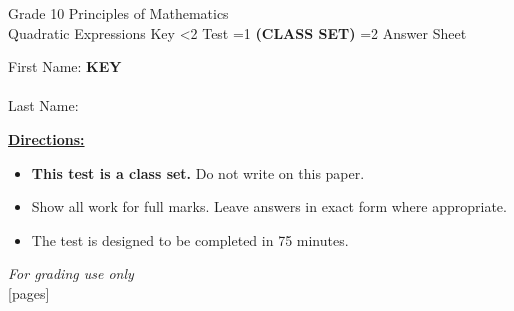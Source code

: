 \documentclass[addpoints]{exam}
\newcommand{\event}{Quadratic Expressions}
\newcommand{\tournament}{}
\def\type{0}
\begin{document}
\begin{center}
    {\huge Grade 10 Principles of Mathematics \\ \event
    \ifprintanswers \space Key
    \else \space \ifnum\type<2 Test \fi \ifnum\type=1 \textbf{(CLASS SET)} \fi
          \ifnum\type=2 Answer Sheet \fi
    \fi \\ \vspace{3mm}\tournament\vspace{1mm}}
\end{center}

\vspace{.25\textheight}

\begin{center}
    First Name: \ifprintanswers
    \underline{\hspace{3.5cm}}\textbf{KEY}\underline{\hspace{5.5cm}}\\\ \vspace{5mm}
    \else \underline{\hspace{10cm}}\\ \vspace{5mm} \fi
    Last Name: \underline{\hspace{10cm}}\\ \vspace{5mm}
\end{center}

\noindent\textbf{\underline{Directions:}}
\begin{itemize}
    \ifnum\type=1 \item \textbf{This test is a class set.} Do not write on this paper. \fi
    \item Show all work for full marks. Leave answers in exact form where appropriate.
    \item The test is designed to be completed in 75 minutes.
\end{itemize}
\begin{center}
\textit{For grading use only}\\
[pages]
\end{center}
\end{document}
